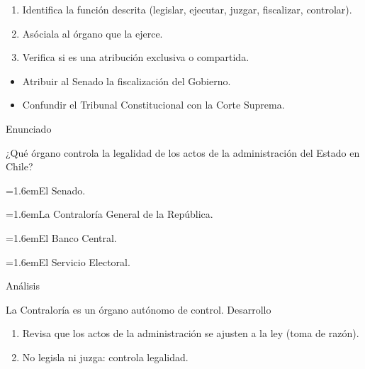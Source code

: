 \documentclass[10pt,a4paper,twocolumn]{article}
\newcommand{\alternativa}[2]{\par\noindent\hangindent=1.6em\hangafter=1\makebox[1.6em][l]{\tecla{#1}}#2\par}
\newcommand{\clave}[1]{\par\smallskip{\sffamily\footnotesize\color{esmeralda} Clave \teclaok{#1}}\par}
\begin{document}
\begin{metodo}
\begin{enumerate}
  \item Identifica la función descrita (legislar, ejecutar, juzgar, fiscalizar, controlar).
  \item Asóciala al órgano que la ejerce.
  \item Verifica si es una atribución exclusiva o compartida.
\end{enumerate}
\end{metodo}

\begin{errorfrecuente}
\begin{itemize}
  \item Atribuir al Senado la fiscalización del Gobierno.
  \item Confundir el Tribunal Constitucional con la Corte Suprema.
\end{itemize}
\end{errorfrecuente}

\begin{ejemplo}
{\sffamily\footnotesize\color{zinc500} Enunciado}\par
¿Qué órgano controla la legalidad de los actos de la administración del Estado en Chile?
\alternativa{A}{El Senado.}
\alternativa{B}{La Contraloría General de la República.}
\alternativa{C}{El Banco Central.}
\alternativa{D}{El Servicio Electoral.}
\clave{B}
{\sffamily\footnotesize\color{zinc500} Análisis}\par La Contraloría es un órgano autónomo de control.
{\sffamily\footnotesize\color{zinc500} Desarrollo}
\begin{enumerate}
  \item Revisa que los actos de la administración se ajusten a la ley (toma de razón).
  \item No legisla ni juzga: controla legalidad.
\end{enumerate}
\end{ejemplo}
\end{document}
